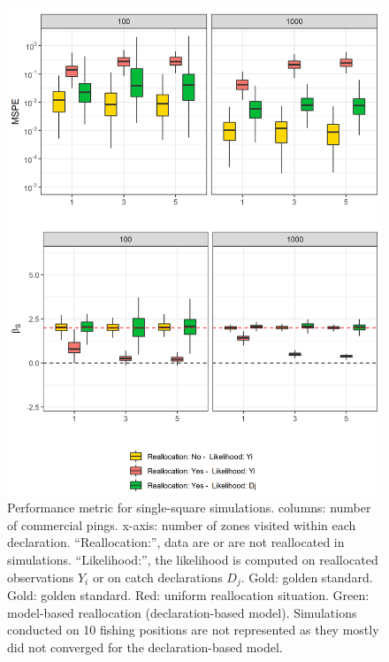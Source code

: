 \documentclass[
  english,
  man]{apa6}
\begin{document}
\begin{figure}
\centering
\includegraphics{images/Perf.metric_single_square.png}
\caption{\label{fig:PerfMetricSingle} Performance metric for single-square simulations. columns: number of commercial pings. x-axis: number of zones visited within each declaration. \enquote{Reallocation:}, data are or are not reallocated in simulations. \enquote{Likelihood:}, the likelihood is computed on reallocated observations \(Y_i\) or on catch declarations \(D_j\). Gold: golden standard. Gold: golden standard. Red: uniform reallocation situation. Green: model-based reallocation (declaration-based model). Simulations conducted on 10 fishing positions are not represented as they mostly did not converged for the declaration-based model.}
\end{figure}
\end{document}
